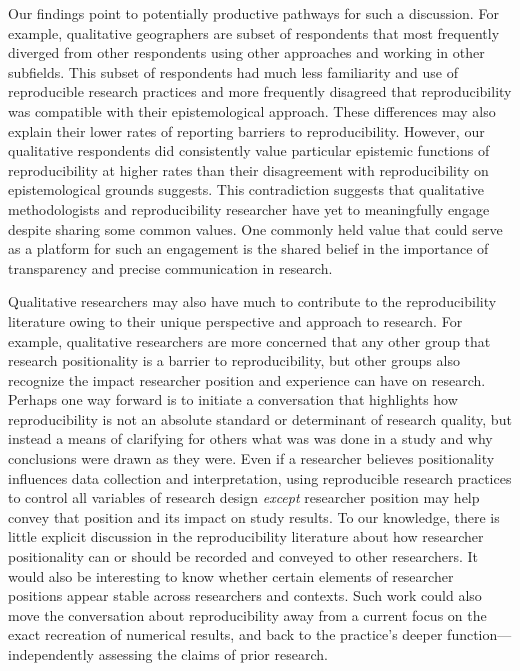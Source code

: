 \documentclass[]{interact}
\theoremstyle{plain}%
\theoremstyle{definition}
\theoremstyle{remark}
\begin{document}
Our findings point to potentially productive pathways for such a discussion. 
For example, qualitative geographers are subset of respondents that most frequently diverged from other respondents using other approaches and working in other subfields.
This subset of respondents had much less familiarity and use of reproducible research practices and more frequently disagreed that reproducibility was compatible with their epistemological approach.
These differences may also explain their lower rates of reporting barriers to reproducibility. 
However, our qualitative respondents did consistently value particular epistemic functions of reproducibility at higher rates than their disagreement with reproducibility on epistemological grounds suggests.
This contradiction suggests that qualitative methodologists and reproducibility researcher have yet to meaningfully engage despite sharing some common values.
One commonly held value that could serve as a platform for such an engagement is the shared belief in the importance of transparency and precise communication in research.

Qualitative researchers may also have much to contribute to the reproducibility literature owing to their unique perspective and approach to research.  
For example, qualitative researchers are more concerned that any other group that research positionality is a barrier to reproducibility, but other groups also recognize the impact researcher position and experience can have on research.
Perhaps one way forward is to initiate a conversation that highlights how reproducibility is not an absolute standard or determinant of research quality, but instead a means of clarifying for others what was was done in a study and why conclusions were drawn as they were.
Even if a researcher believes positionality influences data collection and interpretation, using reproducible research practices to control all variables of research design \textit{except} researcher position may help convey that position and its impact on study results.
To our knowledge, there is little explicit discussion in the reproducibility literature about how researcher positionality can or should be recorded and conveyed to other researchers. 
It would also be interesting to know whether certain elements of researcher positions appear stable across researchers and contexts.
Such work could also move the conversation about reproducibility away from a current focus on the exact recreation of numerical results, and back to the practice's deeper function---independently assessing the claims of prior research. 
\end{document}
